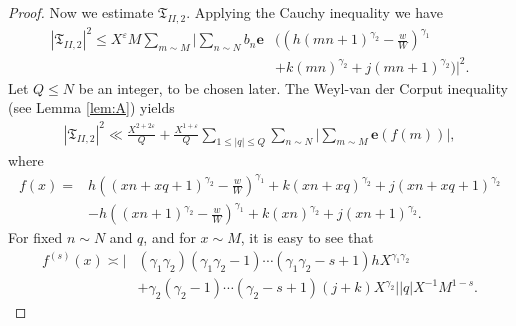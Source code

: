 \documentclass[10pt,a4paper]{amsart}
\begin{document}
\begin{proof}
	Now we estimate $\mathfrak{T}_{II,2}$.
	Applying the Cauchy inequality we have
	\begin{align*}
		|\mathfrak{T}_{II,2}|^2\leqslant X^{\varepsilon}M\sum_{m\sim M}
		\Bigg|\sum_{n\sim N}b_n\mathbf{e}&\bigg(\left(h(mn+1)^{\gamma_2}-\frac{w}{W}\right)^{\gamma_1}\\
		&+k(mn)^{\gamma_2}+j(mn+1)^{\gamma_2}\bigg)\Bigg|^2.
	\end{align*}
	Let $Q\leqslant N$ be an integer, to be chosen later. The Weyl-van der Corput inequality
   (see Lemma \ref{lem:A}) yields
	\begin{align*}
		|\mathfrak{T}_{II,2}|^2\ll\frac{X^{2+2\varepsilon}}{Q}
		+\frac{X^{1+\varepsilon}}{Q}\sum_{1\leqslant |q|\leqslant Q}
		\sum_{n\sim N}\Bigg|\sum_{m\sim M}\mathbf{e}(f(m))\Bigg|,
	\end{align*}
	where
	\begin{align*}
		f(x)=&h\left((xn+xq+1)^{\gamma_2}-\frac{w}{W}\right)^{\gamma_1}
		+k(xn+xq)^{\gamma_2}+j(xn+xq+1)^{\gamma_2}\\
		&-h\left((xn+1)^{\gamma_2}-\frac{w}{W}\right)^{\gamma_1}
		+k(xn)^{\gamma_2}+j(xn+1)^{\gamma_2}.
	\end{align*}
	For fixed $n\sim N$ and $q$, and for $x\sim M$, it is easy to see that
	\begin{align*}
		f^{(s)}(x)\asymp\Big|&(\gamma_1\gamma_2)(\gamma_1\gamma_2-1)\cdots(\gamma_1\gamma_2-s+1)
		hX^{\gamma_1\gamma_2}\\
		&+\gamma_2(\gamma_2-1)\cdots(\gamma_2-s+1)(j+k)X^{\gamma_2}\Big||q|X^{-1}M^{1-s}.
	\end{align*}
	

\end{proof}
\end{document}
